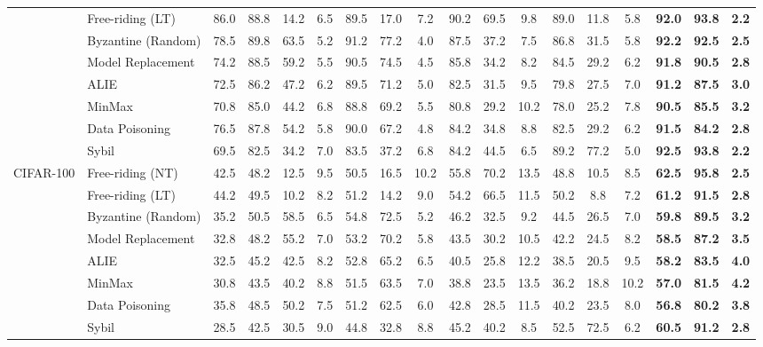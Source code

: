 \begin{table}[t]
{\begin{tabular}{ll|c|ccc|ccc|ccc|ccc|ccc}
& Free-riding (LT) & 86.0 & 88.8 & 14.2 & 6.5 & 89.5 & 17.0 & 7.2 & 90.2 & 69.5 & 9.8 & 89.0 & 11.8 & 5.8 & \textbf{92.0} & \textbf{93.8} & \textbf{2.2} \\
& Byzantine (Random) & 78.5 & 89.8 & 63.5 & 5.2 & 91.2 & 77.2 & 4.0 & 87.5 & 37.2 & 7.5 & 86.8 & 31.5 & 5.8 & \textbf{92.2} & \textbf{92.5} & \textbf{2.5} \\
& Model Replacement & 74.2 & 88.5 & 59.2 & 5.5 & 90.5 & 74.5 & 4.5 & 85.8 & 34.2 & 8.2 & 84.5 & 29.2 & 6.2 & \textbf{91.8} & \textbf{90.5} & \textbf{2.8} \\
& ALIE & 72.5 & 86.2 & 47.2 & 6.2 & 89.5 & 71.2 & 5.0 & 82.5 & 31.5 & 9.5 & 79.8 & 27.5 & 7.0 & \textbf{91.2} & \textbf{87.5} & \textbf{3.0} \\
& MinMax & 70.8 & 85.0 & 44.2 & 6.8 & 88.8 & 69.2 & 5.5 & 80.8 & 29.2 & 10.2 & 78.0 & 25.2 & 7.8 & \textbf{90.5} & \textbf{85.5} & \textbf{3.2} \\
& Data Poisoning & 76.5 & 87.8 & 54.2 & 5.8 & 90.0 & 67.2 & 4.8 & 84.2 & 34.8 & 8.8 & 82.5 & 29.2 & 6.2 & \textbf{91.5} & \textbf{84.2} & \textbf{2.8} \\
& Sybil & 69.5 & 82.5 & 34.2 & 7.0 & 83.5 & 37.2 & 6.8 & 84.2 & 44.5 & 6.5 & 89.2 & 77.2 & 5.0 & \textbf{92.5} & \textbf{93.8} & \textbf{2.2} \\
\cmidrule{1-18}
\multirow{8}{*}{CIFAR-100}
& Free-riding (NT) & 42.5 & 48.2 & 12.5 & 9.5 & 50.5 & 16.5 & 10.2 & 55.8 & 70.2 & 13.5 & 48.8 & 10.5 & 8.5 & \textbf{62.5} & \textbf{95.8} & \textbf{2.5} \\
& Free-riding (LT) & 44.2 & 49.5 & 10.2 & 8.2 & 51.2 & 14.2 & 9.0 & 54.2 & 66.5 & 11.5 & 50.2 & 8.8 & 7.2 & \textbf{61.2} & \textbf{91.5} & \textbf{2.8} \\
& Byzantine (Random) & 35.2 & 50.5 & 58.5 & 6.5 & 54.8 & 72.5 & 5.2 & 46.2 & 32.5 & 9.2 & 44.5 & 26.5 & 7.0 & \textbf{59.8} & \textbf{89.5} & \textbf{3.2} \\
& Model Replacement & 32.8 & 48.2 & 55.2 & 7.0 & 53.2 & 70.2 & 5.8 & 43.5 & 30.2 & 10.5 & 42.2 & 24.5 & 8.2 & \textbf{58.5} & \textbf{87.2} & \textbf{3.5} \\
& ALIE & 32.5 & 45.2 & 42.5 & 8.2 & 52.8 & 65.2 & 6.5 & 40.5 & 25.8 & 12.2 & 38.5 & 20.5 & 9.5 & \textbf{58.2} & \textbf{83.5} & \textbf{4.0} \\
& MinMax & 30.8 & 43.5 & 40.2 & 8.8 & 51.5 & 63.5 & 7.0 & 38.8 & 23.5 & 13.5 & 36.2 & 18.8 & 10.2 & \textbf{57.0} & \textbf{81.5} & \textbf{4.2} \\
& Data Poisoning & 35.8 & 48.5 & 50.2 & 7.5 & 51.2 & 62.5 & 6.0 & 42.8 & 28.5 & 11.5 & 40.2 & 23.5 & 8.0 & \textbf{56.8} & \textbf{80.2} & \textbf{3.8} \\
& Sybil & 28.5 & 42.5 & 30.5 & 9.0 & 44.8 & 32.8 & 8.8 & 45.2 & 40.2 & 8.5 & 52.5 & 72.5 & 6.2 & \textbf{60.5} & \textbf{91.2} & \textbf{2.8} \\
\bottomrule
\end{tabular}}
\end{table}

